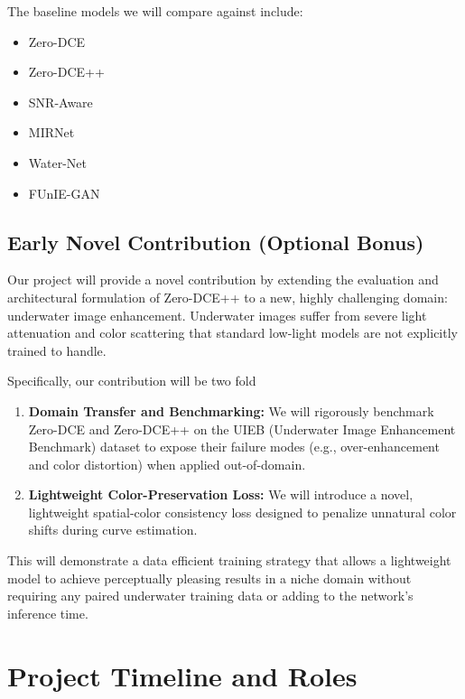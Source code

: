 \documentclass[11pt, letterpaper]{article}
\begin{document}
The baseline models we will compare against include:
\begin{itemize}[noitemsep]
  \item Zero-DCE
  \item Zero-DCE++
  \item SNR-Aware
  \item MIRNet
  \item Water-Net
  \item FUnIE-GAN
\end{itemize}



\subsection{Early Novel Contribution (Optional Bonus)}


Our project will provide a novel contribution by extending the evaluation and architectural formulation of Zero-DCE++ to a new, highly challenging domain: underwater image enhancement. Underwater images suffer from severe light attenuation and color scattering that standard low-light models are not explicitly trained to handle. 

Specifically, our contribution will be two fold 
\begin{enumerate}
    \item \textbf{Domain Transfer and Benchmarking:} We will rigorously benchmark Zero-DCE and Zero-DCE++ on the UIEB (Underwater Image Enhancement Benchmark) dataset to expose their failure modes (e.g., over-enhancement and color distortion) when applied out-of-domain.
    \item \textbf{Lightweight Color-Preservation Loss:} We will introduce a novel, lightweight spatial-color consistency loss designed to penalize unnatural color shifts during curve estimation. 
\end{enumerate}

This will demonstrate a data efficient training strategy that allows a lightweight model to achieve perceptually pleasing results in a niche domain without requiring any paired underwater training data or adding to the network's inference time.
 \section{Project Timeline and Roles}
\end{document}
